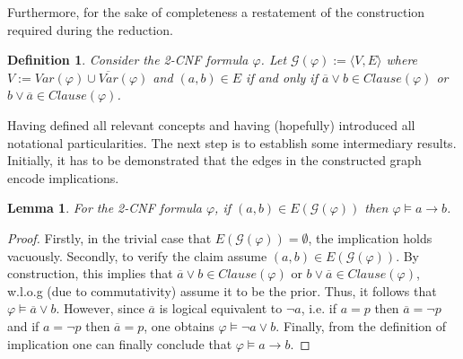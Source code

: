 \documentclass [11pt]{article}
\newcommand{\clau}{\mathit{Clause}}
\newcommand{\var}{\mathit{Var}}
\newtheorem{lemma}[theorem]{Lemma}
\newtheorem{definition}[theorem]{Definition}
\newtheorem{remark}[theorem]{Remark}
\begin{document}
Furthermore, for the sake of completeness a restatement of the construction required during the reduction.


\begin{definition}
Consider the 2-CNF formula $\varphi$. Let $\mathcal{G}(\varphi):= \langle V,E \rangle$ where $V:= \var(\varphi) \cup \overline{\var}(\varphi)$ and $(a,b) \in E$ if and only if $\overline{a} \lor b \in \clau(\varphi)$ or  $b \lor \overline{a}  \in \clau(\varphi)$. 
\end{definition}
%
%
%

Having defined all relevant concepts and having (hopefully) introduced all notational particularities. The next step is to establish some intermediary results. Initially, it has to be demonstrated that the edges in the constructed graph encode implications.


\begin{lemma}
\label{lemma:edge-implication}
For the 2-CNF formula $\varphi$, if $(a,b) \in E(\mathcal{G}(\varphi))$ then $\varphi \models a \to b$.
\end{lemma} 
\begin{proof}
Firstly, in the trivial case that $E(\mathcal{G}(\varphi))=\emptyset$, the implication holds vacuously.
Secondly, to verify the claim assume $(a,b) \in E(\mathcal{G}(\varphi))$. By construction, this implies that 
$\overline{a} \lor b \in \clau(\varphi)$ or  $b \lor \overline{a}\in \clau(\varphi)$, w.l.o.g (due to commutativity) assume it to be the prior. Thus, it follows that 
$\varphi \models \overline{a} \lor b$. However, since $\overline{a}$ is logical equivalent to $\neg a$, i.e. if $a = p$ then $\overline{a} = \neg p$ and if $a = \neg p$ then $\overline{a} =  p$, one obtains $\varphi \models \neg a \lor b$. Finally, from the definition of implication one can finally conclude that $\varphi \models a \to b$.
\end{proof}
\end{document}
